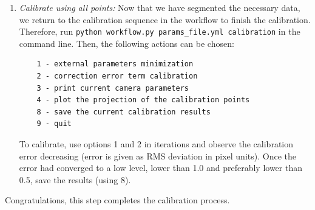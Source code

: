 \documentclass[10pt,a4paper]{article}
\begin{document}
\begin{enumerate}
	\item \textit{Calibrate using all points:} Now that we have segmented the necessary data, we return to the calibration sequence in the workflow to finish the calibration. Therefore, run \texttt{python workflow.py params\_file.yml calibration} in the command line. Then, the following actions can be chosen:
	\begin{verbatim}
	1 - external parameters minimization 
	2 - correction error term calibration
	3 - print current camera parameters
	4 - plot the projection of the calibration points
	8 - save the current calibration results
	9 - quit
	\end{verbatim} 
	To calibrate, use options 1 and 2 in iterations and observe the calibration error decreasing (error is given as RMS deviation in pixel units). Once the error had converged to a low level, lower than 1.0 and preferably lower than 0.5, save the results (using 8).
\end{enumerate}

Congratulations, this step completes the calibration process. 
\end{document}
